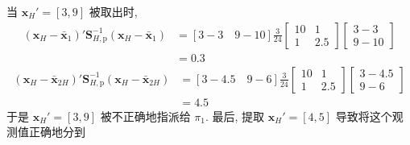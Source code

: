当 $\mathbf{x}_H'=[3,9]$ 被取出时,
\[
\begin{aligned}
(\mathbf{x}_H-\bar{\mathbf{x}}_1)'\mathbf{S}_{H,\mathrm{p}}^{-1}(\mathbf{x}_H-\bar{\mathbf{x}}_1)&=[3-3\quad 9-10]\frac{3}{24}\begin{bmatrix}10&1\\1&2.5\end{bmatrix}\begin{bmatrix}3-3\\9-10\end{bmatrix}\\
&=0.3
\end{aligned}
\]
\[
\begin{aligned}
(\mathbf{x}_H-\bar{\mathbf{x}}_{2H})'\mathbf{S}_{H,\mathrm{p}}^{-1}(\mathbf{x}_H-\bar{\mathbf{x}}_{2H})&=[3-4.5\quad 9-6]\frac{3}{24}\begin{bmatrix}10&1\\1&2.5\end{bmatrix}\begin{bmatrix}3-4.5\\9-6\end{bmatrix}\\
&=4.5
\end{aligned}
\]
于是 $\mathbf{x}_H'=[3,9]$ 被不正确地指派给 $\pi_1$. 最后, 提取 $\mathbf{x}_H'=[4,5]$ 导致将这个观测值正确地分到
